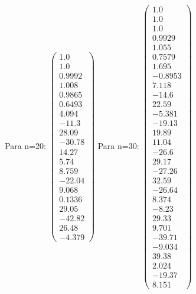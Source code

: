 \documentclass{udpreport}
\begin{document}
\begin{enumerate}
\begin{enumerate}
 				Para n=20:
 				$\left(\begin{array}{c} 1.0\\ 1.0\\ 0.9992\\ 1.008\\ 0.9865\\ 0.6493\\ 4.094\\ -11.3\\ 28.09\\ -30.78\\ 14.27\\ 5.74\\ 8.759\\ -22.04\\ 9.068\\ 0.1336\\ 29.05\\ -42.82\\ 26.48\\ -4.379 \end{array}\right)$
 				Para n=30:
 				$\left(\begin{array}{c} 1.0\\ 1.0\\ 1.0\\ 0.9929\\ 1.055\\ 0.7579\\ 1.695\\ -0.8953\\ 7.118\\ -14.6\\ 22.59\\ -5.381\\ -19.13\\ 19.89\\ 11.04\\ -26.6\\ 29.17\\ -27.26\\ 32.59\\ -26.64\\ 8.374\\ -8.23\\ 29.33\\ 9.701\\ -39.71\\ -9.034\\ 39.38\\ 2.024\\ -19.37\\ 8.151 \end{array}\right)$

\end{enumerate}
\end{enumerate}
\end{document}
